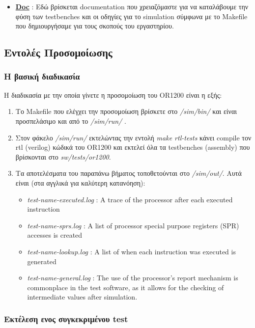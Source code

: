 \documentclass[a4paper,10pt]{article}
\numberwithin{figure}{section}
\numberwithin{table}{section}
\begin{document}
\begin{itemize}
\item \underline{{\bf Doc}} : Εδώ βρίσκεται documentation που χρειαζόμαστε για να καταλάβουμε την φύση των
testbenches και οι οδηγίες για το simulation σύμφωνα με το Makefile που δημιουργήσαμε για τους σκοπούς του εργαστηρίου.
\end{itemize}




\subsection{Εντολές Προσομοίωσης}

\subsubsection{ Η βασική διαδικασία}


Η διαδικασία με την οποία γίνετε η προσομοίωση του OR1200 είναι η εξής:
\begin{enumerate}
 \item Το Makefile που ελέγχει  την προσομοίωση βρίσκετε στο \emph{/sim/bin/} και είναι προσπελάσιμο και από το \emph{/sim/run/} .
 \item Στον φάκελο \emph{/sim/run/} εκτελώντας την εντολή \emph{make rtl-tests} κάνει compile τον rtl
(verilog) κώδικά του OR1200 και εκτελεί όλα τα testbenches (assembly) που βρίσκονται στο \emph{sw/tests/or1200}.
 \item Tα αποτελέσματα του παραπάνω βήματος τοποθετούνται στο \emph{/sim/out/}. Αυτά είναι (στα αγγλικά για καλύτερη κατανόηση):
    \begin{itemize}
     \item \emph{test-name-executed.log} : A trace of the processor after each executed instruction
     \item \emph{test-name-sprs.log} : A list of processor special purpose registers (SPR) accesses is created
     \item \emph{test-name-lookup.log} : A list of when each instruction was executed is generated
     \item \emph{test-name-general.log} : The use of the processor’s report mechanism is commonplace in the
test software, as it allows for the checking of intermediate values after simulation.
    \end{itemize}
\end{enumerate}

\newpage
\subsubsection{ Εκτέλεση ενος συγκεκριμένου test}
\end{document}
